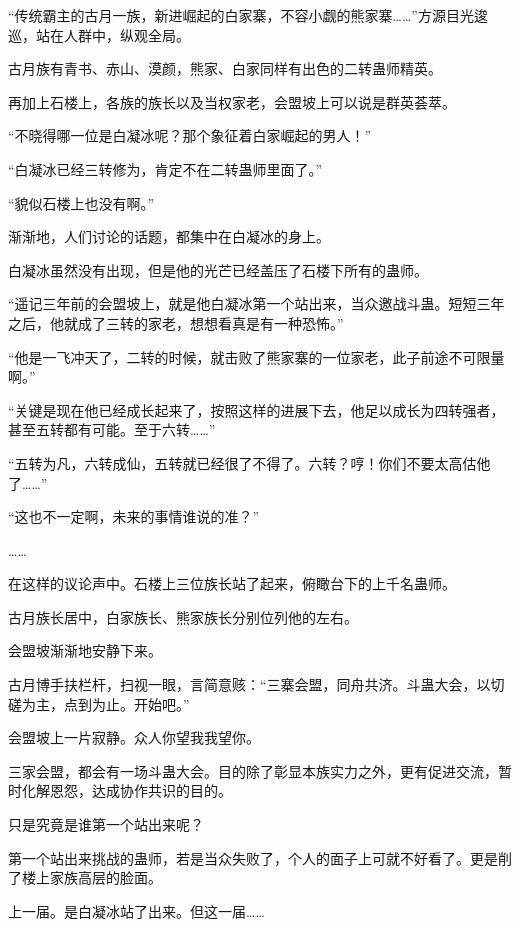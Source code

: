 
\begin{this_body}



“传统霸主的古月一族，新进崛起的白家寨，不容小觑的熊家寨……”方源目光逡巡，站在人群中，纵观全局。

古月族有青书、赤山、漠颜，熊家、白家同样有出色的二转蛊师精英。

再加上石楼上，各族的族长以及当权家老，会盟坡上可以说是群英荟萃。

“不晓得哪一位是白凝冰呢？那个象征着白家崛起的男人！”

“白凝冰已经三转修为，肯定不在二转蛊师里面了。”

“貌似石楼上也没有啊。”

渐渐地，人们讨论的话题，都集中在白凝冰的身上。

白凝冰虽然没有出现，但是他的光芒已经盖压了石楼下所有的蛊师。

“遥记三年前的会盟坡上，就是他白凝冰第一个站出来，当众邀战斗蛊。短短三年之后，他就成了三转的家老，想想看真是有一种恐怖。”

“他是一飞冲天了，二转的时候，就击败了熊家寨的一位家老，此子前途不可限量啊。”

“关键是现在他已经成长起来了，按照这样的进展下去，他足以成长为四转强者，甚至五转都有可能。至于六转……”

“五转为凡，六转成仙，五转就已经很了不得了。六转？哼！你们不要太高估他了……”

“这也不一定啊，未来的事情谁说的准？”

……

在这样的议论声中。石楼上三位族长站了起来，俯瞰台下的上千名蛊师。

古月族长居中，白家族长、熊家族长分别位列他的左右。

会盟坡渐渐地安静下来。

古月博手扶栏杆，扫视一眼，言简意赅：“三寨会盟，同舟共济。斗蛊大会，以切磋为主，点到为止。开始吧。”

会盟坡上一片寂静。众人你望我我望你。

三家会盟，都会有一场斗蛊大会。目的除了彰显本族实力之外，更有促进交流，暂时化解恩怨，达成协作共识的目的。

只是究竟是谁第一个站出来呢？

第一个站出来挑战的蛊师，若是当众失败了，个人的面子上可就不好看了。更是削了楼上家族高层的脸面。

上一届。是白凝冰站了出来。但这一届……


\end{this_body}
